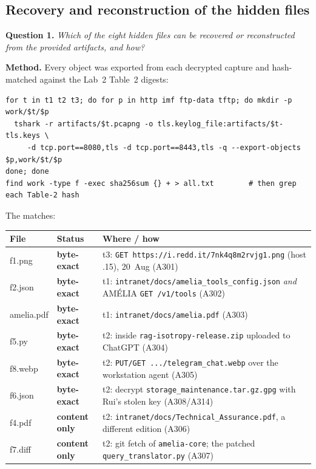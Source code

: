 \documentclass[11pt,a4paper,final,oneside]{article}
\begin{document}
\subsection{Recovery and reconstruction of the hidden files}
\label{sec:q1}

\textbf{Question 1.} \textit{Which of the eight hidden files can be recovered or
reconstructed from the provided artifacts, and how?}

\textbf{Method.} Every object was exported from each decrypted capture and
hash-matched against the Lab~2 Table~2 digests:

{\footnotesize
\begin{verbatim}
for t in t1 t2 t3; do for p in http imf ftp-data tftp; do mkdir -p work/$t/$p
  tshark -r artifacts/$t.pcapng -o tls.keylog_file:artifacts/$t-tls.keys \
     -d tcp.port==8080,tls -d tcp.port==8443,tls -q --export-objects $p,work/$t/$p
done; done
find work -type f -exec sha256sum {} + > all.txt        # then grep each Table-2 hash
\end{verbatim}}

The matches:

\begin{center}
\small
\renewcommand{\arraystretch}{1.15}
\begin{tabularx}{\textwidth}{l l X}
\textbf{File} & \textbf{Status} & \textbf{Where / how} \\
\hline
f1.png & \textbf{byte-exact} & t3: \texttt{GET https://i.redd.it/7nk4q8m2rvjg1.png} (host .15), 20~Aug (A301) \\
f2.json & \textbf{byte-exact} & t1: \texttt{intranet/docs/amelia\_tools\_config.json} \emph{and} AMÉLIA \texttt{GET /v1/tools} (A302) \\
amelia.pdf & \textbf{byte-exact} & t1: \texttt{intranet/docs/amelia.pdf} (A303) \\
f5.py & \textbf{byte-exact} & t2: inside \texttt{rag-isotropy-release.zip} uploaded to ChatGPT (A304) \\
f8.webp & \textbf{byte-exact} & t2: \texttt{PUT/GET .../telegram\_chat.webp} over the workstation agent (A305) \\
f6.json & \textbf{byte-exact} & t2: decrypt \texttt{storage\_maintenance.tar.gz.gpg} with Rui's stolen key (A308/A314) \\
f4.pdf & \textbf{content only} & t2: \texttt{intranet/docs/Technical\_Assurance.pdf}, a different edition (A306) \\
f7.diff & \textbf{content only} & t2: git fetch of \texttt{amelia-core}; the patched \texttt{query\_translator.py} (A307) \\
\end{tabularx}
\end{center}
\end{document}
